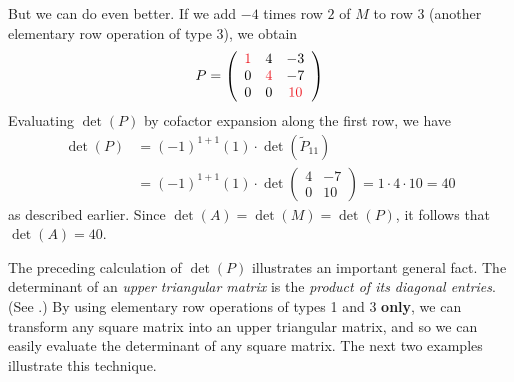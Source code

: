 But we can do even better.
If we add \(-4\) times row \(2\) of \(M\) to row \(3\) (another elementary row operation of type 3), we obtain
\[
    P = \left(\begin{array}{ccc}
        \RED{1} & 4 & -3 \\
        0 & \RED{4} & -7 \\
        0 & 0 & \RED{10}
    \end{array}\right)
\]
Evaluating \(\det(P)\) by cofactor expansion along the first row, we have
\[
    \begin{aligned}
        \det(P)
        & = (-1)^{1+1}(1) \cdot \det\left(\tilde{P}_{11}\right) \\
        & = (-1)^{1+1}(1) \cdot \det\left(\begin{array}{cc}
                4 & -7 \\
                0 & 10
            \end{array}\right) = 1 \cdot 4 \cdot 10=40
    \end{aligned}
\]
as described earlier. Since \(\det(A) = \det(M) = \det(P)\), it follows that \(\det(A)=40\). 

The preceding calculation of \(\det(P)\) illustrates an important general fact.
The determinant of an \emph{upper triangular matrix} is the \emph{product of its diagonal entries}.
(See .)
By using elementary row operations of types 1 and 3 \textbf{only}, we can transform any square matrix into an upper triangular matrix, and so we can easily evaluate the determinant of any square matrix.
The next two examples illustrate this technique.

